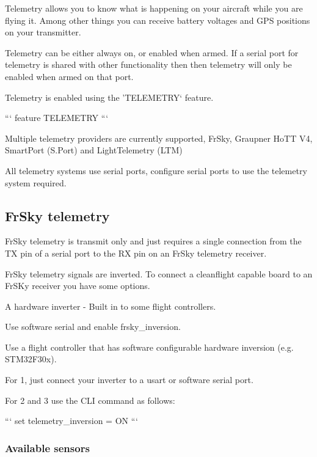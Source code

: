 Telemetry allows you to know what is happening on your aircraft while you are flying it. Among other things you can receive battery voltages and G\+P\+S positions on your transmitter.

Telemetry can be either always on, or enabled when armed. If a serial port for telemetry is shared with other functionality then then telemetry will only be enabled when armed on that port.

Telemetry is enabled using the 'T\+E\+L\+E\+M\+E\+T\+R\+Y` feature.

``` feature T\+E\+L\+E\+M\+E\+T\+R\+Y ```

Multiple telemetry providers are currently supported, Fr\+Sky, Graupner Ho\+T\+T V4, Smart\+Port (S.\+Port) and Light\+Telemetry (L\+T\+M)

All telemetry systems use serial ports, configure serial ports to use the telemetry system required.

\subsection*{Fr\+Sky telemetry}

Fr\+Sky telemetry is transmit only and just requires a single connection from the T\+X pin of a serial port to the R\+X pin on an Fr\+Sky telemetry receiver.

Fr\+Sky telemetry signals are inverted. To connect a cleanflight capable board to an Fr\+S\+Ky receiver you have some options.


\begin{DoxyEnumerate}
\item A hardware inverter -\/ Built in to some flight controllers.
\item Use software serial and enable frsky\+\_\+inversion.
\item Use a flight controller that has software configurable hardware inversion (e.\+g. S\+T\+M32\+F30x).
\end{DoxyEnumerate}

For 1, just connect your inverter to a usart or software serial port.

For 2 and 3 use the C\+L\+I command as follows\+:

``` set telemetry\+\_\+inversion = O\+N ```

\subsubsection*{Available sensors}


